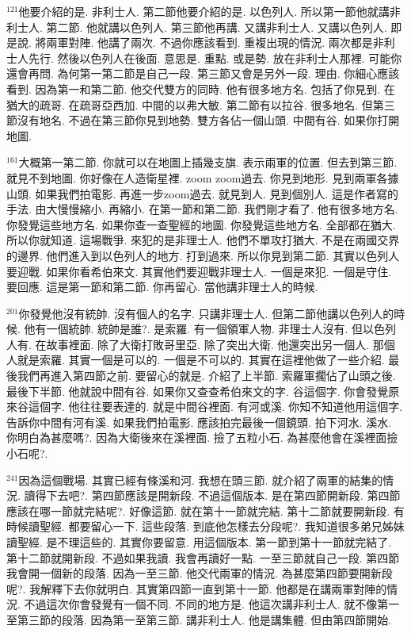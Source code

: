 \documentclass{book}
\begin{document}
$^{121}$他要介紹的是.
非利士人.
第二節他要介紹的是.
以色列人.
所以第一節他就講非利士人.
第二節.
他就講以色列人.
第三節他再講.
又講非利士人.
又講以色列人.
即是說.
將兩軍對陣.
他講了兩次.
不過你應該看到.
重複出現的情況.
兩次都是非利士人先行.
然後以色列人在後面.
意思是.
重點.
或是勢.
放在非利士人那裡.
可能你還會再問.
為何第一第二節是自己一段.
第三節又會是另外一段.
理由.
你細心應該看到.
因為第一和第二節.
他交代雙方的同時.
他有很多地方名.
包括了你見到.
在猶大的疏哥.
在疏哥亞西加.
中間的以弗大敏.
第二節有以拉谷.
很多地名.
但第三節沒有地名.
不過在第三節你見到地勢.
雙方各佔一個山頭.
中間有谷.
如果你打開地圖.

$^{161}$大概第一第二節.
你就可以在地圖上插幾支旗.
表示兩軍的位置.
但去到第三節.
就見不到地圖.
你好像在人造衛星裡.
zoom zoom過去.
你見到地形.
見到兩軍各據山頭.
如果我們拍電影.
再進一步zoom過去.
就見到人.
見到個別人.
這是作者寫的手法.
由大慢慢縮小.
再縮小.
在第一節和第二節.
我們剛才看了.
他有很多地方名.
你發覺這些地方名.
如果你查一查聖經的地圖.
你發覺這些地方名.
全部都在猶大.
所以你就知道.
這場戰爭.
來犯的是非理士人.
他們不單攻打猶大.
不是在兩國交界的邊界.
他們進入到以色列人的地方.
打到過來.
所以你見到第二節.
其實以色列人要迎戰.
如果你看希伯來文.
其實他們要迎戰非理士人.
一個是來犯.
一個是守住.
要回應.
這是第一節和第二節.
你再留心.
當他講非理士人的時候.

$^{201}$你發覺他沒有統帥.
沒有個人的名字.
只講非理士人.
但第二節他講以色列人的時候.
他有一個統帥.
統帥是誰?.
是索羅.
有一個領軍人物.
非理士人沒有.
但以色列人有.
在故事裡面.
除了大衛打敗哥里亞.
除了突出大衛.
他還突出另一個人.
那個人就是索羅.
其實一個是可以的.
一個是不可以的.
其實在這裡他做了一些介紹.
最後我們再進入第四節之前.
要留心的就是.
介紹了上半節.
索羅軍擱佔了山頭之後.
最後下半節.
他就說中間有谷.
如果你又查查希伯來文的字.
谷這個字.
你會發覺原來谷這個字.
他往往要表達的.
就是中間谷裡面.
有河或溪.
你知不知道他用這個字.
告訴你中間有河有溪.
如果我們拍電影.
應該拍完最後一個鏡頭.
拍下河水.
溪水.
你明白為甚麼嗎?.
因為大衛後來在溪裡面.
撿了五粒小石.
為甚麼他會在溪裡面撿小石呢?.

$^{241}$因為這個戰場.
其實已經有條溪和河.
我想在頭三節.
就介紹了兩軍的結集的情況.
讀得下去吧?.
第四節應該是開新段.
不過這個版本.
是在第四節開新段.
第四節應該在哪一節就完結呢?.
好像這節.
就在第十一節就完結.
第十二節就要開新段.
有時候讀聖經.
都要留心一下.
這些段落.
到底他怎樣去分段呢?.
我知道很多弟兄姊妹讀聖經.
是不理這些的.
其實你要留意.
用這個版本.
第一節到第十一節就完結了.
第十二節就開新段.
不過如果我讀.
我會再讀好一點.
一至三節就自己一段.
第四節我會開一個新的段落.
因為一至三節.
他交代兩軍的情況.
為甚麼第四節要開新段呢?.
我解釋下去你就明白.
其實第四節一直到第十一節.
他都是在講兩軍對陣的情況.
不過這次你會發覺有一個不同.
不同的地方是.
他這次講非利士人.
就不像第一至第三節的段落.
因為第一至第三節.
講非利士人.
他是講集體.
但由第四節開始.
\end{document}
